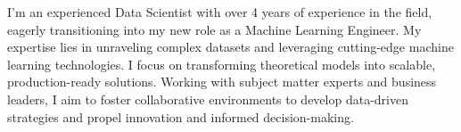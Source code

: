 
\begin{cvparagraph}

I'm an experienced Data Scientist with over 4 years of experience in the field, eagerly transitioning into my new role as a Machine Learning Engineer. My expertise lies in unraveling complex datasets and leveraging cutting-edge machine learning technologies. I focus on transforming theoretical models into scalable, production-ready solutions. Working with subject matter experts and business leaders, I aim to foster collaborative environments to develop data-driven strategies and propel innovation and informed decision-making.
\vspace{-2mm}
\end{cvparagraph}
